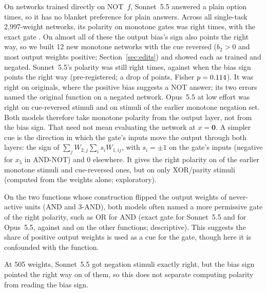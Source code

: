 \documentclass[10pt]{article}
\newcommand{\Sonnet}{Sonnet~5.5}
\newcommand{\Opus}{Opus~5.5}
\begin{document}
On networks trained directly on NOT~$f$, \Sonnet{} answered a plain option \nNativePlain{} times, so it has no blanket preference for plain answers. Across all single-task 2,997-weight networks, its polarity on monotone gates was right \nSonMonoPol{} times, with the exact gate \nSonMonoExact{}. On almost all of these the output bias's sign also points the right way, so we built 12 new monotone networks with the cue reversed ($b_2>0$ and most output weights positive; Section~\ref{sec:edits}) and showed each as trained and negated. \Sonnet's polarity was still right \nRFiveSonCuePol{} times, against \nRFiveSonBasePol{} when the bias sign points the right way (pre-registered; a drop of \nRFiveSonDrop{} points, Fisher $p=0.114$). It was right on \nRFiveSonOrigPol{} originals, where the positive bias suggests a NOT answer; its two errors named the original function on a negated network. \Opus{} at low effort was right on \nRFiveOpusCuePol{} cue-reversed stimuli and on \nRFiveOpusNegMonoPol{} stimuli of the earlier monotone negation set. Both models therefore take monotone polarity from the output layer, not from the bias sign. That need not mean evaluating the network at $x=\mathbf{0}$. A simpler cue is the direction in which the gate's inputs move the output through both layers: the sign of $\sum_j W_{2,j}\sum_i s_i W_{1,ij}$, with $s_i=\pm1$ on the gate's inputs (negative for $x_5$ in AND-NOT) and 0 elsewhere. It gives the right polarity on \nBaseDirMono{} of the earlier monotone stimuli and \nRFiveDirCue{} cue-reversed ones, but on only \nBaseDirXL{} XOR/parity stimuli (computed from the weights alone; exploratory).

On the two functions whose construction flipped the output weights of never-active units (AND and 3-AND), both models often named a more permissive gate of the right polarity, such as OR for AND (exact gate \nRFiveSonFlipExact{} for \Sonnet{} and \nRFiveOpusFlipExact{} for \Opus, against \nRFiveSonOtherExact{} and \nRFiveOpusOtherExact{} on the other functions; descriptive). This suggests the share of positive output weights is used as a cue for the gate, though here it is confounded with the function.

At 505 weights, \Sonnet{} got \nSmallAll{} negation stimuli exactly right, but the bias sign pointed the right way on \nSmallCueOk{} of them, so this does not separate computing polarity from reading the bias sign.
\end{document}
